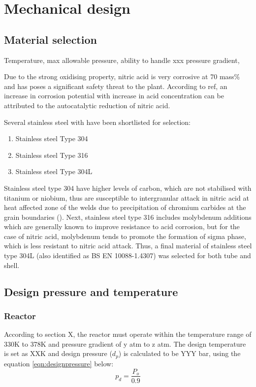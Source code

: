 \section{Mechanical design}
\subsection{Material selection}
Temperature, max allowable pressure, ability to handle xxx pressure gradient, 

Due to the strong oxidising property, nitric acid is very corrosive at 70 mass\% and has poses a significant safety threat to the plant. According to ref, an increase in corrosion potential with increase in acid concentration can be attributed to the autocatalytic reduction of nitric acid. 

Several stainless steel with have been shortlisted for selection: 
\begin{enumerate}
    \item Stainless steel Type 304
    \item Stainless steel Type 316
    \item Stainless steel Type 304L
\end{enumerate}

Stainless steel type 304 have higher levels of carbon, which are not stabilised with titanium or niobium, thus are susceptible to intergranular attack in nitric acid at heat affected zone of the welds due to precipitation of chromium carbides at the grain boundaries (). Next, stainless steel type 316 includes molybdenum additions which are generally known to improve resistance to acid corrosion, but for the case of nitric acid, molybdenum tends to promote the formation of sigma phase, which is less resistant to nitric acid attack. Thus, a final material of stainless steel type 304L (also identified as BS EN 10088-1.4307) was selected for both tube and shell.

\subsection{Design pressure and temperature}
\subsubsection{Reactor}
According to section X, the reactor must operate within the temperature range of 330K to 378K and pressure gradient of y atm to z atm. The design temperature is set as XXK and design pressure ($d_p$) is calculated to be YYY bar, using the equation \ref{eqn:designpressure} below:
\begin{equation}
    p_d = \frac{P_o}{0.9}
    \label{eqn:designpressure}
\end{equation}
